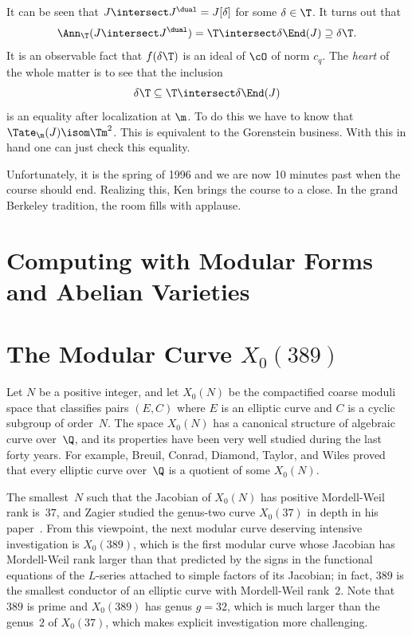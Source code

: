 \documentclass{report}
\begin{document}
It can be seen that $J\intersect J^{\dual}=J[\delta]$ for
some $\delta\in\T$. It turns out that
$$\Ann_{\T}(J\intersect J^{\dual})=\T\intersect\delta\End(J)
                          \supseteq\delta\T.$$
It is an observable fact that
$f(\delta\T)$ is an ideal of $\cO$ of norm $c_q$.
The {\em heart} of the whole matter is to see that the inclusion
$$\delta\T\subseteq\T\intersect\delta\End(J)$$
is an equality after localization at $\m$. To do this we
have to know that
$\Tate_{\m}(J)\isom\Tm^2$. This is equivalent to the Gorenstein
business. With this in hand one can just check this equality.

Unfortunately, it is the spring of 1996 and we are now
10 minutes past when the course should end.
Realizing this, Ken brings the course to a close.
In the grand Berkeley tradition, the room fills
with applause.
\chapter{Computing with Modular Forms and Abelian Varieties}
\chapter{The Modular Curve $X_0(389)$}

Let $N$ be a positive integer, and let $X_0(N)$ be the compactified
coarse moduli space that classifies pairs $(E,C)$ where $E$ is an
elliptic curve and $C$ is a cyclic subgroup of order~$N$.  The space
$X_0(N)$ has a canonical structure of algebraic curve over~$\Q$, and
its properties have been very well studied during the last forty years.
For example, Breuil, Conrad, Diamond, Taylor, and Wiles proved that
every elliptic curve over~$\Q$ is a quotient of some $X_0(N)$.

The smallest~$N$ such that the Jacobian of $X_0(N)$ has positive
Mordell-Weil rank is~$37$, and Zagier studied the genus-two curve
$X_0(37)$ in depth in his paper~\cite{zagier:modular}.  From this
viewpoint, the next modular curve deserving intensive investigation is
$X_0(389)$, which is the first modular curve whose Jacobian has
Mordell-Weil rank larger than that predicted by the signs in the
functional equations of the $L$-series attached to simple factors of
its Jacobian; in fact, $389$ is the smallest conductor of an elliptic
curve with Mordell-Weil rank~$2$.  Note that $389$ is prime and
$X_0(389)$ has genus $g=32$, which is much larger than the genus~$2$
of $X_0(37)$, which makes explicit investigation more challenging.
\end{document}
